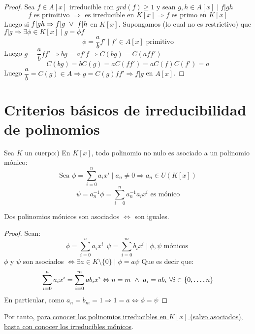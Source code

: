 \begin{teo}[de Gauss]
\begin{proof}
    
    Sea $f \in A[x]$ irreducible con $grd(f)\geq 1$ y sean $g,h \in A[x] \mid f|gh$
    $$f \mbox{ es primitivo } \Rightarrow \mbox{ es irreducible en } K[x] \Rightarrow f \mbox{ es primo en } K[x]$$
    Luego si $f|gh \Rightarrow f|g \ \lor \  f|h$ en $K[x]$.\newline
    Supongamos (lo cual no es restrictivo) que $f|g \Rightarrow \exists \phi \in K[x] \mid g=\phi f$
    $$\phi = \dfrac{a}{b}f' \mid f' \in A[x] \mbox{ primitivo}$$
    Luego $g=\dfrac{a}{b}ff' \Rightarrow bg=af'f \Rightarrow C(bg)=C(aff')$
    $$C(bg)=bC(g)=aC(ff')=aC(f)C(f')=a$$
    Luego $\dfrac{a}{b}=C(g) \in A \Rightarrow g = C(g)ff' \Rightarrow f|g$ en $A[x]$.
\end{proof}
\end{teo}

\newpage
\section{Criterios básicos de irreducibilidad de polinomios}
Sea $K$ un cuerpo:) En $K[x]$, todo polinomio no nulo es asociado a un polinomio mónico:
$$\mbox{Sea } \phi=\sum_{i=0}^na_i x^i \mid a_n \neq 0 \Rightarrow a_n \in U(K[x])$$
$$\psi = a_n^{-1}\phi = \sum_{i=0}^n a_n^{-1}a_i x^i \mbox{ es mónico}$$

\begin{lema}
    Dos polinomios mónicos son asociados $\Leftrightarrow$ son iguales.
\begin{proof}
    Sean: $$\phi=\sum_{i=0}^n a_i x^i~~\psi = \sum_{i=0}^m b_i x^i \mid \phi, \psi \mbox{ mónicos }$$
    $\phi$ y $\psi$ son asociados $\Leftrightarrow \exists a \in K\setminus\{0\}\mid \phi = a\psi$\newline
    Que es decir que:
    $$\sum_{i=0}^n a_i x^i = \sum_{i=0}^m ab_i x^i \Leftrightarrow n=m \ \land \  a_i = ab_i ~\forall i \in \{0, \ldots, n\}$$
    En particular, como $a_n=b_m = 1 \Rightarrow 1=a \Leftrightarrow \phi = \psi$
\end{proof}
\end{lema}

Por tanto,
\underline{para conocer los polinomios irreducibles en $K[x]$ (salvo asociados),}\newline
\underline{basta con conocer los irreducibles mónicos}.\\

